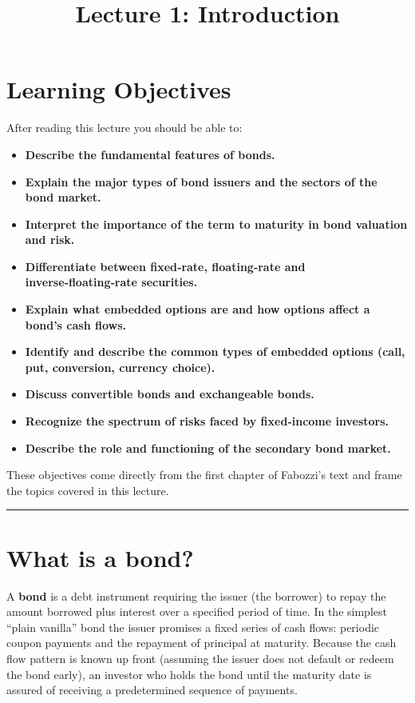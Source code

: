 \documentclass[
  letterpaper,
  DIV=11,
  numbers=noendperiod]{scrartcl}
\title{Lecture 1: Introduction}
\author{}
\date{}
\providecommand{\tightlist}{%
  \setlength{\itemsep}{0pt}\setlength{\parskip}{0pt}}
\begin{document}
\maketitle


\setcounter{secnumdepth}{3}

\section*{Learning Objectives}\label{learning-objectives}

After reading this lecture you should be able to:

\begin{itemize}
\tightlist
\item
  \textbf{Describe the fundamental features of bonds.}
\item
  \textbf{Explain the major types of bond issuers and the sectors of the
  bond market.}
\item
  \textbf{Interpret the importance of the term to maturity in bond
  valuation and risk.}
\item
  \textbf{Differentiate between fixed‑rate, floating‑rate and
  inverse‑floating‑rate securities.}
\item
  \textbf{Explain what embedded options are and how options affect a
  bond's cash flows.}
\item
  \textbf{Identify and describe the common types of embedded options
  (call, put, conversion, currency choice).}
\item
  \textbf{Discuss convertible bonds and exchangeable bonds.}
\item
  \textbf{Recognize the spectrum of risks faced by fixed‑income
  investors.}
\item
  \textbf{Describe the role and functioning of the secondary bond
  market.}
\end{itemize}

These objectives come directly from the first chapter of Fabozzi's text
and frame the topics covered in this lecture.

\begin{center}\rule{0.5\linewidth}{0.5pt}\end{center}

\section{What is a bond?}\label{what-is-a-bond}

A \textbf{bond} is a debt instrument requiring the issuer (the borrower)
to repay the amount borrowed plus interest over a specified period of
time. In the simplest ``plain vanilla'' bond the issuer promises a fixed
series of cash flows: periodic coupon payments and the repayment of
principal at maturity. Because the cash flow pattern is known up front
(assuming the issuer does not default or redeem the bond early), an
investor who holds the bond until the maturity date is assured of
receiving a predetermined sequence of payments.
\end{document}
